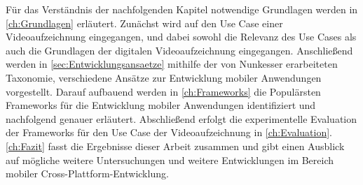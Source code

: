 Für das Verständnis der nachfolgenden Kapitel notwendige Grundlagen werden in \autoref{ch:Grundlagen} erläutert.
Zunächst wird auf den Use Case einer Videoaufzeichnung eingegangen, und dabei sowohl die Relevanz des Use Cases als auch die Grundlagen der digitalen Videoaufzeichnung eingegangen.
Anschließend werden in \autoref{sec:Entwicklungsansaetze} mithilfe der von Nunkesser \cite{Nunkesser_Taxonomy_Apps} erarbeiteten Taxonomie, verschiedene Ansätze zur Entwicklung mobiler Anwendungen vorgestellt.
Darauf aufbauend werden in \autoref{ch:Frameworks} die Populärsten Frameworks für die Entwicklung mobiler Anwendungen identifiziert und nachfolgend genauer erläutert.
Abschließend erfolgt die experimentelle Evaluation der Frameworks für den Use Case der Videoaufzeichnung in \autoref{ch:Evaluation}.
\autoref{ch:Fazit} fasst die Ergebnisse dieser Arbeit zusammen und gibt einen Ausblick auf mögliche weitere Untersuchungen und weitere Entwicklungen im Bereich mobiler Cross-Plattform-Entwicklung.
